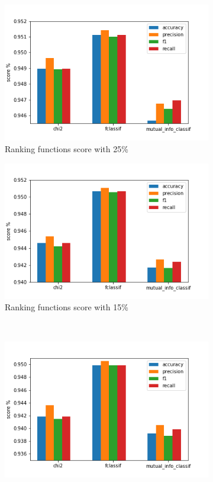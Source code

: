 \begin{figure}[]
	\centering
	\begin{subfigure}[t]{0.48\textwidth}
		\centering
		\includegraphics[width=\linewidth]{univariance25.png}
		\caption{Ranking functions score with 25\%}\label{fig:ranking25}		
	\end{subfigure}
	\begin{subfigure}[t]{0.48\textwidth}
		\centering
		\includegraphics[width=\linewidth]{univariance15.png}
		\caption{Ranking functions score with 15\%}\label{fig:ranking15}
	\end{subfigure}\\
	\begin{subfigure}[t]{0.48\textwidth}
		\centering
		\includegraphics[width=\linewidth]{univariance10.png}

\end{subfigure}
\end{figure}
